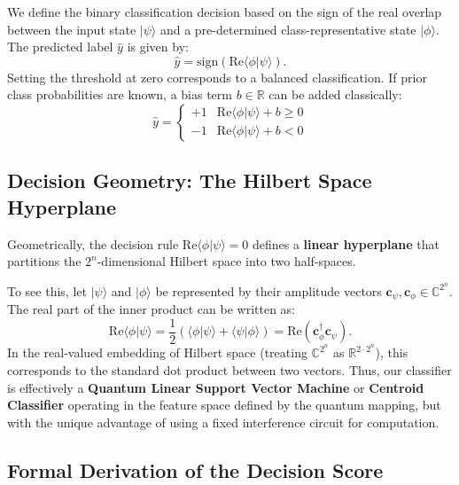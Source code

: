 \documentclass[conference]{IEEEtran}
\begin{document}
We define the binary classification decision based on the sign of the real overlap between the input state $|\psi\rangle$ and a pre-determined class-representative state $|\phi\rangle$. The predicted label $\hat{y}$ is given by:
\begin{equation}
\hat{y} = \text{sign}\left( \mathrm{Re}\langle \phi | \psi \rangle \right).
\end{equation}
Setting the threshold at zero corresponds to a balanced classification. If prior class probabilities are known, a bias term $b \in \mathbb{R}$ can be added classically:
\begin{equation}
\hat{y} = \begin{cases} +1 & \mathrm{Re}\langle \phi | \psi \rangle + b \geq 0 \\ -1 & \mathrm{Re}\langle \phi | \psi \rangle + b < 0 \end{cases}
\end{equation}

\subsection{Decision Geometry: The Hilbert Space Hyperplane}

Geometrically, the decision rule $\mathrm{Re}\langle \phi | \psi \rangle = 0$ defines a \textbf{linear hyperplane} that partitions the $2^n$-dimensional Hilbert space into two half-spaces. 

To see this, let $|\psi\rangle$ and $|\phi\rangle$ be represented by their amplitude vectors $\mathbf{c}_\psi, \mathbf{c}_\phi \in \mathbb{C}^{2^n}$. The real part of the inner product can be written as:
\begin{equation}
\mathrm{Re}\langle \phi | \psi \rangle = \frac{1}{2}\left( \langle \phi | \psi \rangle + \langle \psi | \phi \rangle \right) = \text{Re}(\mathbf{c}_\phi^\dagger \mathbf{c}_\psi).
\end{equation}
In the real-valued embedding of Hilbert space (treating $\mathbb{C}^{2^n}$ as $\mathbb{R}^{2 \cdot 2^n}$), this corresponds to the standard dot product between two vectors. Thus, our classifier is effectively a \textbf{Quantum Linear Support Vector Machine} or \textbf{Centroid Classifier} operating in the feature space defined by the quantum mapping, but with the unique advantage of using a fixed interference circuit for computation.

\subsection{Formal Derivation of the Decision Score}
\end{document}
